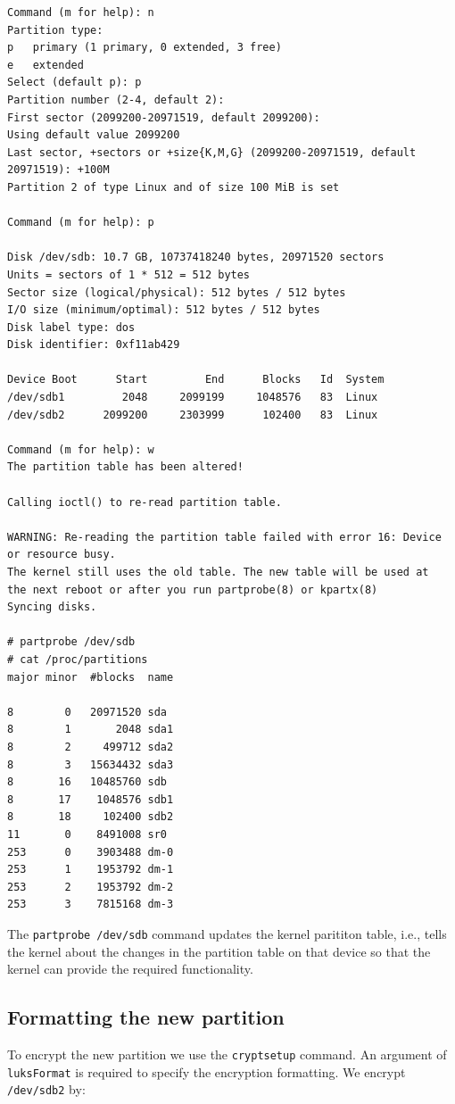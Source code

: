 \vspace{-15pt}
\begin{verbatim}
Command (m for help): n  
Partition type:
p   primary (1 primary, 0 extended, 3 free)
e   extended
Select (default p): p
Partition number (2-4, default 2): 
First sector (2099200-20971519, default 2099200): 
Using default value 2099200
Last sector, +sectors or +size{K,M,G} (2099200-20971519, default 20971519): +100M
Partition 2 of type Linux and of size 100 MiB is set

Command (m for help): p

Disk /dev/sdb: 10.7 GB, 10737418240 bytes, 20971520 sectors
Units = sectors of 1 * 512 = 512 bytes
Sector size (logical/physical): 512 bytes / 512 bytes
I/O size (minimum/optimal): 512 bytes / 512 bytes
Disk label type: dos
Disk identifier: 0xf11ab429

Device Boot      Start         End      Blocks   Id  System
/dev/sdb1         2048     2099199     1048576   83  Linux
/dev/sdb2      2099200     2303999      102400   83  Linux

Command (m for help): w
The partition table has been altered!

Calling ioctl() to re-read partition table.

WARNING: Re-reading the partition table failed with error 16: Device or resource busy.
The kernel still uses the old table. The new table will be used at
the next reboot or after you run partprobe(8) or kpartx(8)
Syncing disks.

# partprobe /dev/sdb
# cat /proc/partitions
major minor  #blocks  name

8        0   20971520 sda
8        1       2048 sda1
8        2     499712 sda2
8        3   15634432 sda3
8       16   10485760 sdb
8       17    1048576 sdb1
8       18     102400 sdb2
11       0    8491008 sr0
253      0    3903488 dm-0
253      1    1953792 dm-1
253      2    1953792 dm-2
253      3    7815168 dm-3	
\end{verbatim}
\vspace{-10pt}

\noindent
The \verb|partprobe /dev/sdb| command updates the kernel parititon table, i.e., tells the kernel about the changes in the partition table on that device so that the kernel can provide the required functionality. 

\subsection{Formatting the new partition}
To encrypt the new partition we use the \verb|cryptsetup| command. An argument of \verb|luksFormat| is required to specify the encryption formatting. We encrypt \verb|/dev/sdb2| by:

